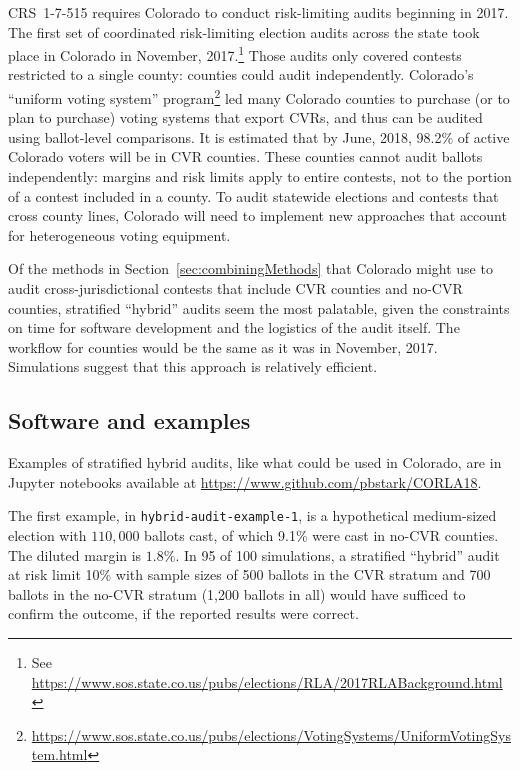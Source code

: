 \documentclass[runningheads]{llncs}
\begin{document}
CRS~1-7-515 requires Colorado to conduct risk-limiting audits beginning in 2017.
The first set of coordinated risk-limiting election audits across the state took place in Colorado in November, 2017.\footnote{%
 See \url{https://www.sos.state.co.us/pubs/elections/RLA/2017RLABackground.html}
}
Those audits only covered contests restricted to a single county:
counties could audit independently.
Colorado's ``uniform voting system'' program\footnote{%
  \url{https://www.sos.state.co.us/pubs/elections/VotingSystems/UniformVotingSystem.html}
} 
led many Colorado counties to purchase (or to plan to purchase) voting systems
that export CVRs, and thus can be audited using ballot-level comparisons.
It is estimated that by June, 2018, 98.2\% of active Colorado voters will be in CVR counties.
These counties cannot audit ballots independently:
margins and risk limits apply to entire contests, not to the portion of a contest included in a county.
To audit statewide elections and contests that cross county lines, Colorado will need to implement new approaches
that account for heterogeneous voting equipment.


Of the methods in Section~\ref{sec:combiningMethods} that Colorado might use to audit cross-jurisdictional contests
that include CVR counties and no-CVR counties,
stratified ``hybrid'' audits seem the most palatable,
given the constraints on time for software development and the logistics
of the audit itself. 
The workflow for counties would be the same
as it was in November, 2017.
Simulations suggest that this approach is relatively efficient.


\subsection{Software and examples}
Examples of stratified hybrid audits, like what could be used in Colorado, are in Jupyter notebooks available
at \url{https://www.github.com/pbstark/CORLA18}.

The first example, in \texttt{hybrid-audit-example-1}, is a hypothetical medium-sized election with 
$110,000$ ballots cast, of which 
9.1\% were cast in no-CVR counties. 
The diluted margin is $1.8\%$.
In 95 of 100 simulations, a stratified ``hybrid'' audit at risk limit 10\% with sample sizes of 500 ballots 
in the CVR stratum and 700 ballots in the no-CVR stratum
(1,200 ballots in all)
would have sufficed to confirm the outcome, if the reported results were correct.
\end{document}
